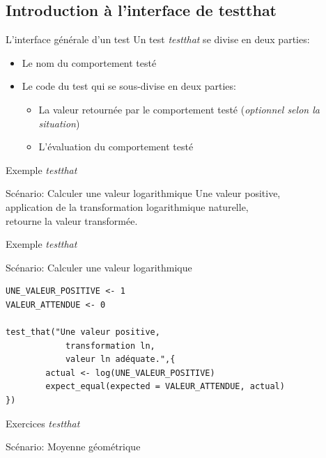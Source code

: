 \documentclass[11pt]{beamer}
\newcommand{\gotoR}[1]{%
	\begin{center}
		\colorbox{ulgold}{\color{black}
			\makebox[50mm][c]{%
				\makebox[5mm]{\raisebox{-1pt}{\large\faChevronCircleDown}}\;%
				{\ttfamily #1}}}
\end{center}}
\begin{document}
\subsection{Introduction à l'interface de testthat}
\begin{frame}{L'interface générale d'un test}
Un test \textit{testthat} se divise en deux parties:
\begin{itemize}
	\item Le nom du comportement testé %
	\item Le code du test qui se sous-divise en deux parties: %
	\begin{itemize}
		\item  La valeur retournée par le comportement testé (\textit{optionnel selon la situation})
		\item L'évaluation du comportement testé
	\end{itemize}
\end{itemize}
\end{frame}

\begin{frame}{Exemple \textit{testthat}}
\begin{block}{Scénario: Calculer une valeur logarithmique}
Une valeur positive, \\
application de la transformation logarithmique naturelle, \\
retourne la valeur transformée.
\end{block}
\end{frame}

\begin{frame}[fragile]{Exemple \textit{testthat}}
\begin{block}{Scénario: Calculer une valeur logarithmique}
\begin{lstlisting}
UNE_VALEUR_POSITIVE <- 1
VALEUR_ATTENDUE <- 0

test_that("Une valeur positive,
            transformation ln,
            valeur ln adéquate.",{
        actual <- log(UNE_VALEUR_POSITIVE)
        expect_equal(expected = VALEUR_ATTENDUE, actual)
})
\end{lstlisting}
\end{block}
\end{frame}

\begin{frame}{Exercices \textit{testthat}}
\begin{block}{Scénario: Moyenne géométrique}
\gotoR{partie\_1/exemple\_2.R}
\end{block}
\end{frame}
\end{document}
